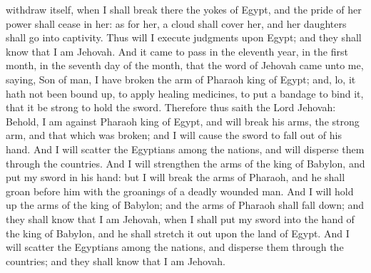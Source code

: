 withdraw itself, when I shall break there the yokes of Egypt, and the pride of her power shall cease in her: as for her, a cloud shall cover her, and her daughters shall go into captivity. Thus will I execute judgments upon Egypt; and they shall know that I am Jehovah.  And it came to pass in the eleventh year, in the first month, in the seventh day of the month, that the word of Jehovah came unto me, saying, Son of man, I have broken the arm of Pharaoh king of Egypt; and, lo, it hath not been bound up, to apply healing medicines, to put a bandage to bind it, that it be strong to hold the sword. Therefore thus saith the Lord Jehovah: Behold, I am against Pharaoh king of Egypt, and will break his arms, the strong arm, and that which was broken; and I will cause the sword to fall out of his hand. And I will scatter the Egyptians among the nations, and will disperse them through the countries. And I will strengthen the arms of the king of Babylon, and put my sword in his hand: but I will break the arms of Pharaoh, and he shall groan before him with the groanings of a deadly wounded man. And I will hold up the arms of the king of Babylon; and the arms of Pharaoh shall fall down; and they shall know that I am Jehovah, when I shall put my sword into the hand of the king of Babylon, and he shall stretch it out upon the land of Egypt. And I will scatter the Egyptians among the nations, and disperse them through the countries; and they shall know that I am Jehovah. 

